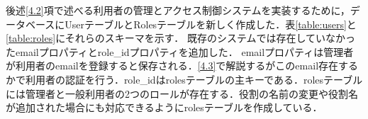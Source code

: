 後述\ref{4.2}項で述べる利用者の管理とアクセス制御システムを実装するために，データベースにUserテーブルとRolesテーブルを新しく作成した．表\ref{table:users}と\ref{table:roles}にそれらのスキーマを示す．
既存のシステムでは存在していなかったemailプロパティとrole\_idプロパティを追加した．
emailプロパティは管理者が利用者のemailを登録すると保存される．\ref{4.3}で解説するがこのemail存在するかで利用者の認証を行う．role\_idはrolesテーブルの主キーである．rolesテーブルには管理者と一般利用者の2つのロールが存在する．役割の名前の変更や役割名が追加された場合にも対応できるようにrolesテーブルを作成している．



\begin{table}[]
  \caption{Usersテーブル}
  \centering
    \label{table:users}
\end{table}


\begin{table}[]
  \caption{Rolesテーブル}
  \centering
  \label{table:roles}
\end{table}



